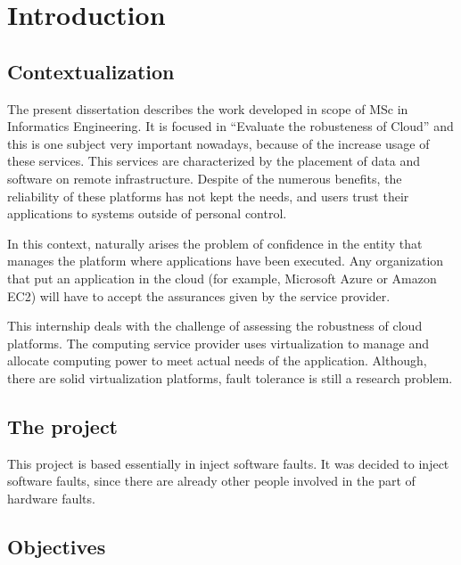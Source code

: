 \newpage
\section{Introduction}

\subsection{Contextualization}
The present dissertation describes the work developed in scope of MSc in Informatics Engineering. It is focused in ``Evaluate the robusteness of Cloud'' and this is one subject very important nowadays, because of the increase usage of these services.
This services are characterized by the placement of data and software on remote infrastructure. Despite of the numerous benefits, the reliability of these platforms has not kept the needs, and users trust their applications to systems outside of personal control.

In this context, naturally arises the problem of confidence in the entity that manages the platform where applications have been executed. Any organization that put an application in the cloud (for example, Microsoft Azure or Amazon EC2) will have to accept the assurances given by the service provider.

This internship deals with the challenge of assessing the robustness of cloud platforms. The computing service provider uses virtualization to manage and allocate computing power to meet actual needs of the application. Although, there are solid virtualization platforms, fault tolerance is still a research problem.



\subsection{The project}

This project is based essentially in inject software faults. It was decided to inject software faults, since there are already other people involved in the part of hardware faults.

\subsection{Objectives}


